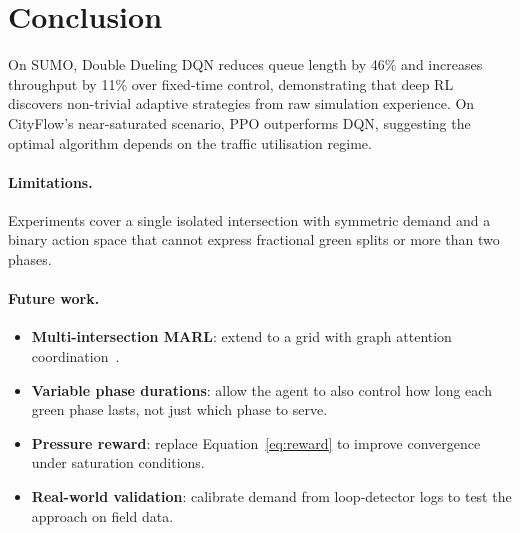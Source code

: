\documentclass[twoside,11pt]{article}
\begin{document}
\section{Conclusion}

On SUMO, Double Dueling DQN reduces queue length by 46\% and increases
throughput by 11\% over fixed-time control, demonstrating that deep RL
discovers non-trivial adaptive strategies from raw simulation experience.
On CityFlow's near-saturated scenario, PPO outperforms DQN, suggesting the
optimal algorithm depends on the traffic utilisation regime.

\paragraph{Limitations.}
Experiments cover a single isolated intersection with symmetric demand and a
binary action space that cannot express fractional green splits or more than
two phases.

\paragraph{Future work.}
\begin{itemize}
  \item \textbf{Multi-intersection MARL}: extend to a grid with graph
        attention coordination~\citep{wei2019colight}.
  \item \textbf{Variable phase durations}: allow the agent to also control
        how long each green phase lasts, not just which phase to serve.
  \item \textbf{Pressure reward}: replace Equation~\ref{eq:reward} to improve
        convergence under saturation conditions.
  \item \textbf{Real-world validation}: calibrate demand from loop-detector
        logs to test the approach on field data.
\end{itemize}



\end{document}
